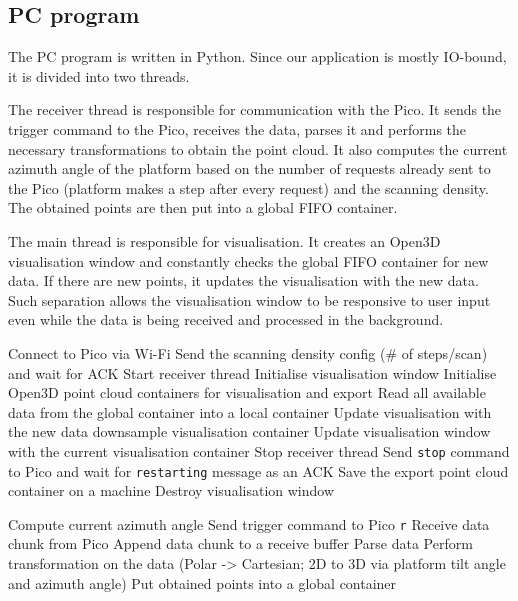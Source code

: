 \subsection{PC program}
The PC program is written in Python. Since our application is mostly IO-bound, it is divided into two threads.

The receiver thread is responsible for communication with the Pico. It sends the trigger command to the Pico, receives the data, parses it and performs the necessary transformations to obtain the point cloud. It also computes the current azimuth angle of the platform based on the number of requests already sent to the Pico (platform makes a step after every request) and the scanning density.
The obtained points are then put into a global FIFO container.

The main thread is responsible for visualisation. It creates an Open3D visualisation window and constantly checks the global FIFO container for new data.
If there are new points, it updates the visualisation with the new data. Such separation allows the visualisation window to be responsive to user input even while the data is being received and processed in the background.
\begin{algorithm}[H]
\caption{PC main thread pseudocode}
\label{alg:pc-main-thread}
\begin{algorithmic}
    \State Connect to Pico via Wi-Fi
    \State Send the scanning density config (\# of steps/scan) and wait for ACK
    \State Start receiver thread
    \State Initialise visualisation window
    \State Initialise Open3D point cloud containers for visualisation and export
        \State Read all available data from the global container into a local container
            \State Update visualisation with the new data
                \State downsample visualisation container
            \EndIf
        \EndIf
        \State Update visualisation window with the current visualisation container
    \EndWhile
    \State Stop receiver thread
    \State Send \texttt{stop} command to Pico and wait for \texttt{restarting} message as an ACK
    \State Save the export point cloud container on a machine
    \State Destroy visualisation window
\end{algorithmic}
\end{algorithm}
\begin{algorithm}[H]
\caption{PC receiver thread pseudocode}
\label{alg:pc-receiver-thread}
\begin{algorithmic}
    \State Compute current azimuth angle
    \State Send trigger command to Pico \texttt{r}
    \Repeat
    \State Receive data chunk from Pico
    \State Append data chunk to a receive buffer
    \State Parse data
    \State Perform transformation on the data (Polar -> Cartesian; 2D to 3D via platform tilt angle and azimuth angle)
    \State Put obtained points into a global container
    \EndFor
\end{algorithmic}
\end{algorithm}

